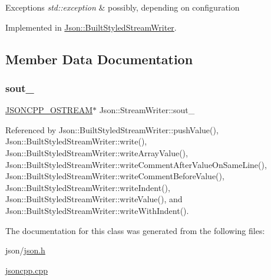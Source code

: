 \begin{DoxyExceptions}{Exceptions}
{\em std\+::exception} & possibly, depending on configuration \\
\hline
\end{DoxyExceptions}


Implemented in \hyperlink{structJson_1_1BuiltStyledStreamWriter_a823cdb1afabb6b0d5f39bcd5a6a6f747_a823cdb1afabb6b0d5f39bcd5a6a6f747}{Json\+::\+Built\+Styled\+Stream\+Writer}.



\subsection{Member Data Documentation}
\mbox{\label{classJson_1_1StreamWriter_a4f5603d4228a9fa46a42cb44e5234d9b_a4f5603d4228a9fa46a42cb44e5234d9b}} 
\subsubsection{\texorpdfstring{sout\+\_\+}{sout\_}}
{\footnotesize\ttfamily \hyperlink{json_8h_a37a25be5fca174927780caeb280094ce_a37a25be5fca174927780caeb280094ce}{J\+S\+O\+N\+C\+P\+P\+\_\+\+O\+S\+T\+R\+E\+AM}$\ast$ Json\+::\+Stream\+Writer\+::sout\+\_\+\hspace{0.3cm}{\ttfamily [protected]}}



Referenced by Json\+::\+Built\+Styled\+Stream\+Writer\+::push\+Value(), Json\+::\+Built\+Styled\+Stream\+Writer\+::write(), Json\+::\+Built\+Styled\+Stream\+Writer\+::write\+Array\+Value(), Json\+::\+Built\+Styled\+Stream\+Writer\+::write\+Comment\+After\+Value\+On\+Same\+Line(), Json\+::\+Built\+Styled\+Stream\+Writer\+::write\+Comment\+Before\+Value(), Json\+::\+Built\+Styled\+Stream\+Writer\+::write\+Indent(), Json\+::\+Built\+Styled\+Stream\+Writer\+::write\+Value(), and Json\+::\+Built\+Styled\+Stream\+Writer\+::write\+With\+Indent().



The documentation for this class was generated from the following files\+:\begin{DoxyCompactItemize}
\item 
json/\hyperlink{json_8h}{json.\+h}\item 
\hyperlink{jsoncpp_8cpp}{jsoncpp.\+cpp}\end{DoxyCompactItemize}

